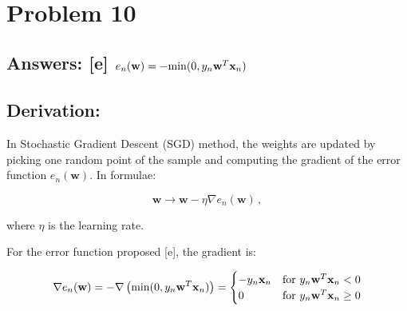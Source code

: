 \documentclass[11pt]{article}
\begin{document}
    \begin{center}
    \end{center}
    { \hspace*{\fill} \\}
    
    \hypertarget{problem-10}{%
\section{Problem 10}\label{problem-10}}

\hypertarget{answers-e-e_nmathbfw-rm-min0y_nmathbfwtmathbfx_n}{%
\subsection{\texorpdfstring{Answers: {[}e{]}
\(e_n(\mathbf{w})=-{\rm min}(0,y_n\mathbf{w}^T\mathbf{x}_n)\)}{Answers: {[}e{]} e\_n(\textbackslash{}mathbf\{w\})=-\{\textbackslash{}rm min\}(0,y\_n\textbackslash{}mathbf\{w\}\^{}T\textbackslash{}mathbf\{x\}\_n)}}\label{answers-e-e_nmathbfw-rm-min0y_nmathbfwtmathbfx_n}}

\hypertarget{derivation}{%
\subsection{Derivation:}\label{derivation}}

In Stochastic Gradient Descent (SGD) method, the weights are updated by
picking one random point of the sample and computing the gradient of the
error function \(e_n(\mathbf{w})\). In formulae:

\begin{equation}
\mathbf{w}\rightarrow \mathbf{w}-\eta \nabla e_n(\mathbf{w})\,,
\end{equation}

where \(\eta\) is the learning rate.

For the error function proposed {[}e{]}, the gradient is:

\begin{equation}
 \nabla e_n(\mathbf{w})= -\nabla \left({\rm min}(0,y_n\mathbf{w}^T\mathbf{x}_n)\right)=
\begin{cases}
-y_n\mathbf{x}_n & \text{for } y_n\mathbf{w}^T\mathbf{x}_n < 0\\
0  & \text{for } y_n\mathbf{w}^T\mathbf{x}_n \ge 0
\end{cases}
\end{equation}
\end{document}
